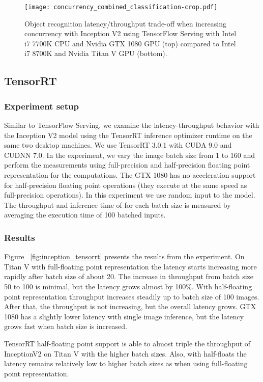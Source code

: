 \documentclass[sigconf]{acmart}
\begin{document}
\begin{figure}[t]
\centering
\texttt{[image: concurrency\_combined\_classification-crop.pdf]}
\caption{Object recognition latency/throughput trade-off when increasing concurrency with Inception V2 using TensorFlow Serving with Intel i7 7700K CPU and Nvidia GTX 1080 GPU (top) compared to Intel i7 8700K and Nvidia Titan V GPU (bottom).}
\label{fig:concurrency_combined_class}
\end{figure}\subsection{TensorRT}\subsubsection{Experiment setup}
Similar to TensorFlow Serving, we examine the latency-throughput behavior with the Inception V2 model using the TensorRT inference optimizer runtime on the same two desktop machines. We use TensorRT 3.0.1 with CUDA 9.0 and CUDNN 7.0. In the experiment, we vary the image batch size from 1 to 160 and perform the measurements using full-precision and half-precision floating point representation for the computations. The GTX 1080 has no acceleration support for half-precision floating point operations (they execute at the same speed as full-precision operations). In this experiment we use random input to the model. The throughput and inference time of for each batch size is measured by averaging the execution time of 100 batched inputs.

\subsubsection{Results}
Figure ~\ref{fig:inception_tensorrt} presents the results from the experiment. On Titan V with full-floating point representation the latency starts increasing more rapidly after batch size of about 20. The increase in throughput from batch size 50 to 100 is minimal, but the latency grows almost by 100\%. With half-floating point representation throughput increases steadily up to batch size of 100 images. After that, the throughput is not increasing, but the overall latency grows. GTX 1080 has a slightly lower latency with single image inference, but the latency grows fast when batch size is increased.

TensorRT half-floating point support is able to almost triple the throughput of InceptionV2 on Titan V with the higher batch sizes. Also, with half-floats the latency remains relatively low to higher batch sizes as when using full-floating point representation.
\end{document}
